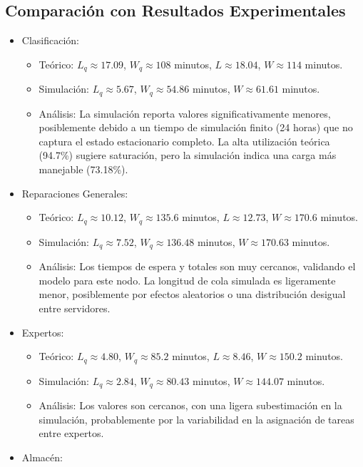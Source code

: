 \documentclass[12pt]{article}
\begin{document}
\subsection{Comparación con Resultados Experimentales}
\begin{itemize}
    \item Clasificación:
    \begin{itemize}
        \item Teórico: $L_q \approx 17.09$, $W_q \approx 108$ minutos, $L \approx 18.04$, $W \approx 114$ minutos.
        \item Simulación: $L_q \approx 5.67$, $W_q \approx 54.86$ minutos, $W \approx 61.61$ minutos.
        \item Análisis: La simulación reporta valores significativamente menores, posiblemente debido a un tiempo de simulación finito (24 horas) que no captura el estado estacionario completo. La alta utilización teórica (94.7\%) sugiere saturación, pero la simulación indica una carga más manejable (73.18\%).
    \end{itemize}
    \item Reparaciones Generales:
    \begin{itemize}
        \item Teórico: $L_q \approx 10.12$, $W_q \approx 135.6$ minutos, $L \approx 12.73$, $W \approx 170.6$ minutos.
        \item Simulación: $L_q \approx 7.52$, $W_q \approx 136.48$ minutos, $W \approx 170.63$ minutos.
        \item Análisis: Los tiempos de espera y totales son muy cercanos, validando el modelo para este nodo. La longitud de cola simulada es ligeramente menor, posiblemente por efectos aleatorios o una distribución desigual entre servidores.
    \end{itemize}
    \item Expertos:
    \begin{itemize}
        \item Teórico: $L_q \approx 4.80$, $W_q \approx 85.2$ minutos, $L \approx 8.46$, $W \approx 150.2$ minutos.
        \item Simulación: $L_q \approx 2.84$, $W_q \approx 80.43$ minutos, $W \approx 144.07$ minutos.
        \item Análisis: Los valores son cercanos, con una ligera subestimación en la simulación, probablemente por la variabilidad en la asignación de tareas entre expertos.
    \end{itemize}
    \item Almacén:

\end{itemize}
\end{document}
